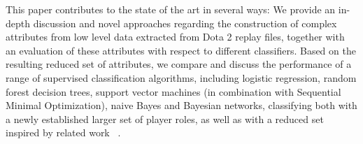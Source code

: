 This paper contributes to the state of the art in several ways: We provide an in-depth discussion and novel approaches regarding the construction of complex attributes from low level data extracted from Dota 2 replay files, together with an evaluation of these attributes with respect to different classifiers. Based on the resulting reduced set of attributes, we compare and discuss the performance of a range of supervised classification algorithms, including logistic regression, random forest decision trees, support vector machines (in combination with Sequential Minimal Optimization), naive Bayes and Bayesian networks, classifying both with a newly established larger set of player roles, as well as with a reduced set inspired by related work ~\cite{eggert2015classification}.